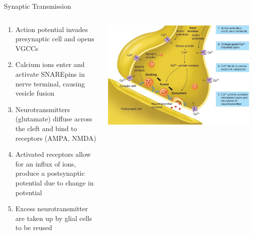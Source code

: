 \documentclass{beamer}
\begin{document}
\begin{frame}{Synaptic Transmission}
\begin{columns}
\begin{column}{0.47\textwidth}
\begin{enumerate} \tiny
    \item<1->Action potential invades presynaptic cell and opens VGCCs
    \item<2->Calcium ions enter and activate SNAREpins in nerve terminal, causing vesicle fusion
    \item<3->Neurotransmitters (glutamate) diffuse across the cleft and bind to receptors (AMPA, NMDA)
    \item<4->Activated receptors allow for an influx of ions, produce a postsynaptic potential due to change in potential 
    \item<5->Excess neurotransmitter are taken up by glial cells to be reused
\end{enumerate}
    \end{column}
    \begin{column}{0.5\textwidth}
    \includegraphics[width=1\textwidth]{fig1.jpg}
    \end{column}
\end{columns}
\end{frame}
\end{document}
